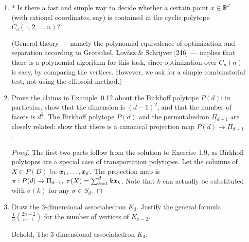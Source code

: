 \documentclass{article}
\begin{document}
\begin{enumerate}
\begin{proof}
\end{proof}

\item* Is there a fast and simple way to decide whether a certain point $x\in\mathbb{R}^d$ (with rational coordinates, say) is contained in the cyclic polytope $C_d(1,2,\ldots,n)$? 

(General theory — namely the polynomial equivalence of optimization and separation according to Gr\"otschel, Lov\'asz \& Schrijver [246] — implies that there is a polynomial algorithm for this task, since optimization over $C_d(n)$ is easy, by comparing the vertices. However, we ask for a simple combinatorial test, not using the ellipsoid method.)

\item Prove the claims in Example~0.12 about the Birkhoff polytope $P(d)$: in particular, show that the dimension is $(d-1)^2$, and that the number of facets is $d^2$. The Birkhoff polytope $P(d)$ and the permutahedron $\Pi_{d-1}$ are closely related: show that there is a canonical projection map $P(d)\to \Pi_{d-1}$.

\begin{proof}
    The first two parts follow from the solution to Exercise 1.9, as Birkhoff polytopes are a special case of transportation polytopes. Let the columns of $X \in P(D)$ be $\textbf{\textit{x}}_1, \ldots, \textbf{\textit{x}}_{d}$. The projection map is $\pi: P(d) \to \Pi_{d-1},\; \pi(X) = \sum_{k=1}^d k\textbf{\textit{x}}_k$. Note that $k$ can actually be substituted with $\sigma(k)$ for any $\sigma \in S_d$.
\end{proof}

\item Draw the 3-dimensional associahedron $K_{3}$. Justify the general
formula $\frac{1}{n} \binom{2n-2}{n-1}$ for the number of vertices of $K_{n-2}$.

\begin{solution}
 
Behold, The 3-dimensional associahedron $K_3$.

\begin{figure}[H]
    \centering

\end{figure}
\end{solution}
\end{enumerate}
\end{document}
